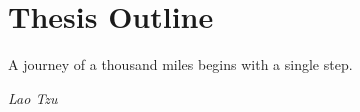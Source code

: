 \chapter{\label{chp:outline}Thesis Outline}
\vspace{-2 cm}
\epigraph{A journey of a thousand miles begins with a single step.}{\textit{Lao Tzu}}

